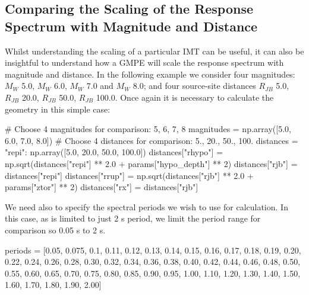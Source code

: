 \subsection{Comparing the Scaling of the Response Spectrum with Magnitude and Distance}

Whilst understanding the scaling of a particular IMT can be useful, it can also be insightful to understand how a GMPE will scale the response spectrum with magnitude and distance. In the following example we consider four magnitudes: $M_W$ 5.0, $M_W$ 6.0, $M_W$ 7.0 and $M_W$ 8.0; and four source-site distances $R_{JB}$ 5.0, $R_{JB}$ 20.0, $R_{JB}$ 50.0, $R_{JB}$ 100.0. Once again it is necessary to calculate the geometry in this simple case:
\begin{python}
# Choose 4 magnitudes for comparison: 5, 6, 7, 8
magnitudes = np.array([5.0, 6.0, 7.0, 8.0])
# Choose 4 distances for comparison: 5., 20., 50., 100.
distances = {"repi": np.array([5.0, 20.0, 50.0, 100.0])}
distances["rhypo"] = np.sqrt(distances["repi"] ** 2.0 +
                             params["hypo_depth"] ** 2)
distances["rjb"] = distances["repi"]
distances["rrup"] = np.sqrt(distances["rjb"] ** 2.0 + 
                            params["ztor"] ** 2)
distances["rx"] = distances["rjb"]
\end{python}

We need also to specify the spectral periods we wish to use for calculation. In this case, as \textcite{AkkarCagnan2010} is limited to just 2 s period, we limit the period range for comparison so 0.05 s to 2 s.

\begin{python}
periods = [0.05, 0.075, 0.1, 0.11, 0.12, 0.13, 0.14, 0.15,
           0.16, 0.17, 0.18, 0.19, 0.20, 0.22, 0.24, 0.26, 
           0.28, 0.30, 0.32, 0.34, 0.36, 0.38, 0.40, 0.42, 
           0.44, 0.46, 0.48, 0.50, 0.55, 0.60, 0.65, 0.70,
           0.75, 0.80, 0.85, 0.90, 0.95, 1.00, 1.10, 1.20, 
           1.30, 1.40, 1.50, 1.60, 1.70, 1.80, 1.90, 2.00]
\end{python}

